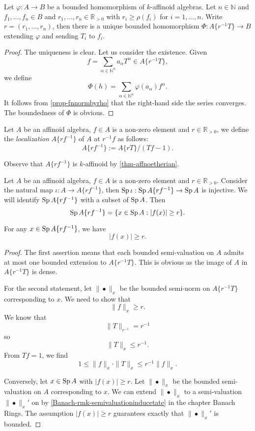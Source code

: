 \begin{corollary}\label{cor-univpropTatenonstrict}
    Let $\varphi:A\rightarrow B$ be a bounded homomorphism of $k$-affinoid algebras. Let $n\in \mathbb{N}$ and  $f_1,\ldots,f_n\in B$ and $r_1,\ldots,r_n\in \mathbb{R}_{>0}$ with $r_i\geq \rho(f_i)$ for $i=1,\ldots,n$. Write $r=(r_1,\ldots,r_n)$, then there is a unique bounded homomorphism $\Phi:A\{r^{-1}T\}\rightarrow B$ extending $\varphi$ and sending $T_i$ to $f_i$.
\end{corollary}
\begin{proof}
    The uniqueness is clear. Let us consider the existence. Given 
    \[
        f=\sum_{\alpha\in \mathbb{N}^n} a_{\alpha}T^{\alpha}\in A\{r^{-1}T\}, 
    \]
    we define 
    \[
        \Phi(h)=\sum_{\alpha\in \mathbb{N}^n} \varphi(a_{\alpha})f^{\alpha}. 
    \]
    It follows from \cref{prop-fnnormbyrho} that the right-hand side the series converges. The boundedness of $\Phi$ is obvious.
\end{proof}


\begin{definition}\label{def-localizationaff}
    Let $A$ be an affinoid algebra, $f\in A$ is a non-zero element and $r\in \mathbb{R}_{>0}$, we define the \emph{localization} $A\{rf^{-1}\}$ of $A$ at $r^{-1}f$ as follows:
    \[
        A\{rf^{-1}\}:=A\{rT\}/(Tf-1).
    \]
\end{definition}
Observe that $A\{rf^{-1}\}$ is $k$-affinoid by \cref{thm-affnoetherian}. 

\begin{proposition}\label{prop-afflocalizationprop}
    Let $A$ be an affinoid algebra, $f\in A$ is a non-zero element and $r\in \mathbb{R}_{>0}$.
    Consider the natural map $\iota:A\rightarrow A\{rf^{-1}\}$, then $\operatorname{Sp} \iota:\operatorname{Sp} A\{rf^{-1}\}\rightarrow \operatorname{Sp} A$ is injective. We will identify $\operatorname{Sp} A\{rf^{-1}\}$ with a subset of $\operatorname{Sp} A$. Then
    \[
        \operatorname{Sp} A\{rf^{-1}\}= \{x\in \operatorname{Sp} A: |f(x)|\geq r\}.
    \]

    For any $x\in \operatorname{Sp} A\{rf^{-1}\}$, we have
    \[
        |f(x)|\geq r.  
    \]
\end{proposition}
\begin{proof}
    The first assertion means that each bounded semi-valuation on $A$ admits at most one bounded extension to $A\{r^{-1}T\}$. This is obvious as the image of $A$ in $A\{r^{-1}T\}$ is dense.

    For the second statement, let $\|\bullet\|_x$ be the bounded semi-norm on $A\{r^{-1}T\}$ corresponding to $x$. We need to show that
    \[
        \|f\|_x \geq r.  
    \]
    We know that 
    \[
        \|T\|_{r^{-1}}=r^{-1}  
    \]
    so 
    \[
        \|T\|_x\leq r^{-1}.  
    \]
    From $Tf=1$, we find
    \[
        1\leq \|f\|_x\cdot \|T\|_x\leq r^{-1}  \|f\|_x.
    \]

    Conversely, let $x\in \operatorname{Sp} A$ with $|f(x)|\geq r$. Let $\|\bullet\|_x$ be the bounded semi-valuation on $A$ corresponding to $x$. We can extend $\|\bullet\|_x$ to a semi-valuation $\|\bullet\|_x'$ on by \cref{Banach-rmk-semivaluationinducetate} in the chapter Banach Rings. The assumption $|f(x)|\geq r$ guarantees exactly that $\|\bullet\|_x'$ is bounded.
\end{proof}


